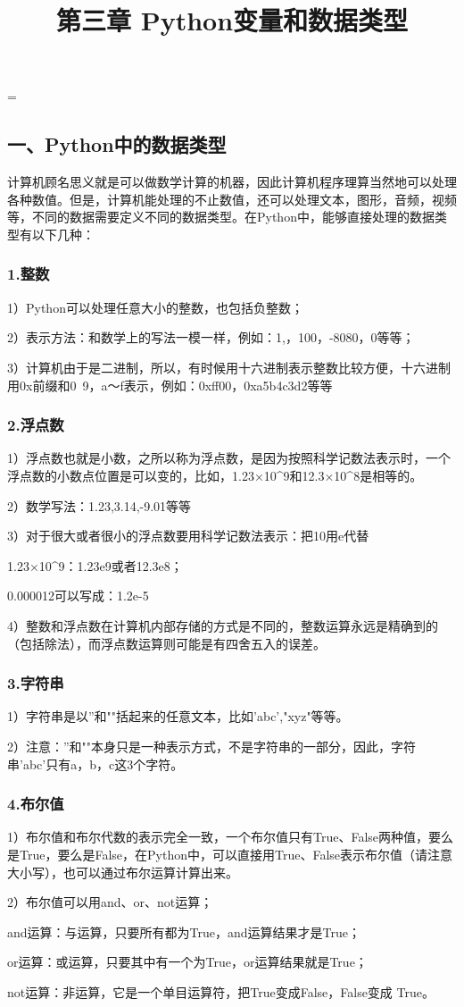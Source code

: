 \documentclass{article}
\begin{document}
 
\hfuzz=\maxdimen
{}
\begin{CJK}{UTF8}{gbsn}  
\title{第三章 Python变量和数据类型}
\author{}
\date{}
\maketitle
\part*{一、Python中的数据类型}
\subparagraph*{}
计算机顾名思义就是可以做数学计算的机器，因此计算机程序理算当然地可以处理各种数值。但是，计算机能处理的不止数值，还可以处理文本，图形，音频，视频等，不同的数据需要定义不同的数据类型。在Python中，能够直接处理的数据类型有以下几种：
\section*{1.整数}
\subparagraph*{}
1）Python可以处理任意大小的整数，也包括负整数；
\subparagraph*{}
2）表示方法：和数学上的写法一模一样，例如：1,，100，-8080，0等等；
\subparagraph*{}
3）计算机由于是二进制，所以，有时候用十六进制表示整数比较方便，十六进制用0x前缀和0~9，a～f表示，例如：0xff00，0xa5b4c3d2等等
\section*{2.浮点数}
\subparagraph*{}
1）浮点数也就是小数，之所以称为浮点数，是因为按照科学记数法表示时，一个浮点数的小数点位置是可以变的，比如，1.23×10\^{}9和12.3×10\^{}8是相等的。
\subparagraph*{}
2）数学写法：1.23,3.14,-9.01等等
\subparagraph*{}
3）对于很大或者很小的浮点数要用科学记数法表示：把10用e代替
\subparagraph*{}
1.23×10\^{}9：1.23e9或者12.3e8；
\subparagraph*{}
0.000012可以写成：1.2e-5
\subparagraph*{}
4）整数和浮点数在计算机内部存储的方式是不同的，整数运算永远是精确到的（包括除法），而浮点数运算则可能是有四舍五入的误差。
\section*{3.字符串}
\subparagraph*{}
1）字符串是以''和""括起来的任意文本，比如'abc',"xyz"等等。
\subparagraph*{}
2）注意：''和""本身只是一种表示方式，不是字符串的一部分，因此，字符串'abc'只有a，b，c这3个字符。
\section*{4.布尔值}
\subparagraph*{}
1）布尔值和布尔代数的表示完全一致，一个布尔值只有True、False两种值，要么是True，要么是False，在Python中，可以直接用True、False表示布尔值（请注意大小写），也可以通过布尔运算计算出来。
\subparagraph*{}
2）布尔值可以用and、or、not运算；
\subparagraph*{}
and运算：与运算，只要所有都为True，and运算结果才是True；
\subparagraph*{}
or运算：或运算，只要其中有一个为True，or运算结果就是True；
\subparagraph*{}
not运算：非运算，它是一个单目运算符，把True变成False，False变成
True。

\end{CJK}
\end{document}

